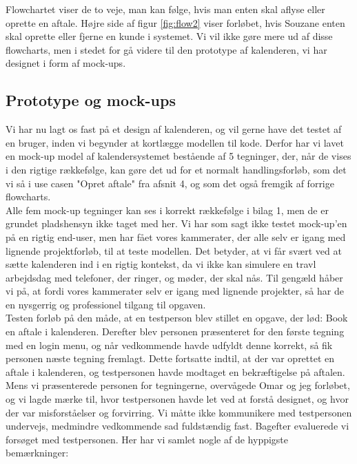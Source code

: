 \documentclass[12pt]{article}   %
\begin{document}
\vspace{0.5cm}

Flowchartet viser de to veje, man kan følge, hvis man enten skal aflyse eller oprette en aftale. Højre side af figur \ref{fig:flow2} viser forløbet, hvis Souzane enten skal oprette eller fjerne en kunde i systemet. Vi vil ikke gøre mere ud af disse flowcharts, men i stedet for gå videre til den prototype af kalenderen, vi har designet i form af mock-ups. \\

\subsection{Prototype og mock-ups}
Vi har nu lagt os fast på et design af kalenderen, og vil gerne have det testet af en bruger, inden vi begynder at kortlægge modellen til kode. Derfor har vi lavet en mock-up model af kalendersystemet bestående af 5 tegninger, der, når de vises i den rigtige rækkefølge, kan gøre det ud for et normalt handlingsforløb, som det vi så i use casen "Opret aftale" fra afsnit 4, og som det også fremgik af forrige flowcharts. \\
Alle fem mock-up tegninger kan ses i korrekt rækkefølge i bilag 1, men de er grundet pladshensyn ikke taget med her. Vi har som sagt ikke testet mock-up'en på en rigtig end-user, men har fået vores kammerater, der alle selv er igang med lignende projektforløb, til at teste modellen. Det betyder, at vi får svært ved at sætte kalenderen ind i en rigtig kontekst, da vi ikke kan simulere en travl arbejdsdag med telefoner, der ringer, og møder, der skal nås. Til gengæld håber vi på, at fordi vores kammerater selv er igang med lignende projekter, så har de en nysgerrig og professionel tilgang til opgaven. \\
Testen forløb på den måde, at en testperson blev stillet en opgave, der lød: Book en aftale i kalenderen. Derefter blev personen præsenteret for den første tegning med en login menu, og når vedkommende havde udfyldt denne korrekt, så fik personen næste tegning fremlagt. Dette fortsatte indtil, at der var oprettet en aftale i kalenderen, og testpersonen havde modtaget en bekræftigelse på aftalen. Mens vi præsenterede personen for tegningerne, overvågede Omar og jeg forløbet, og vi lagde mærke til, hvor testpersonen havde let ved at forstå designet, og hvor der var misforståelser og forvirring. Vi måtte ikke kommunikere med testpersonen undervejs, medmindre vedkommende sad fuldstændig fast. Bagefter evaluerede vi forsøget med testpersonen. Her har vi samlet nogle af de hyppigste bemærkninger:
\end{document}
